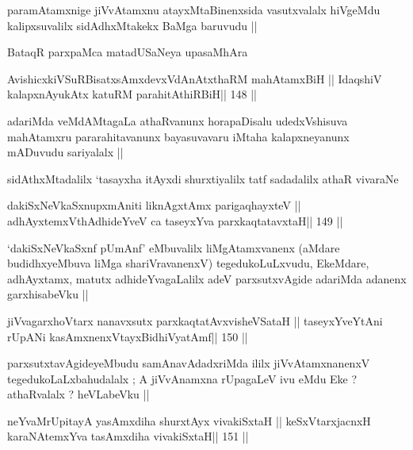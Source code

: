 \begin{artha}
paramAtamxnige jiVvAtamxnu atayxMtaBinenxsida vasutxvalalx hiVgeMdu
kalipxsuvalilx sidAdhxMtakekx BaMga baruvudu ||
\end{artha}

\begin{artha}
BataqR parxpaMca matadUSaNeya upasaMhAra
\end{artha}

\begin{shl}
AvishicxkiVSuRBisatxsAmxdevxVdAnAtxthaRM mahAtamxBiH ||
IdaqshiV kalapxnA\s yukAtx katuRM parahitAthiRBiH\hfill || 148 ||
\end{shl}

\begin{artha}
adariMda veMdAMtagaLa athaRvanunx horapaDisalu udedxVshisuva
mahAtamxru pararahitavanunx bayasuvavaru iMtaha kalapxneyanunx
mADuvudu sariyalalx ||
\end{artha}

\begin{artha}
sidAthxMtadalilx `tasayxha itAyxdi shurxtiyalilx tatf sadadalilx athaR
vivaraNe 
\end{artha}

\begin{shl}
dakiSxNeV\s kaSxnupxmAniti liknAgxtAmx parigaqhayxteV ||
adhAyxtemxV\s thAdhideYveV ca taseyxYva parxkaqtatavxtaH\hfill || 149 ||
\end{shl}

\begin{artha}
`dakiSxNeV\s kaSxnf pUmAnf' eMbuvalilx liMgAtamxvanenx (aMdare
  budidhxyeMbuva liMga shariVravanenxV) tegedukoLuLxvudu, EkeMdare,
  adhAyxtamx, matutx adhideYvagaLalilx adeV parxsutxvAgide adariMda
  adanenx garxhisabeVku ||
\end{artha}

\begin{shl}
jiVvagarxhoV\s tarx nanavxsutx parxkaqtatAvxvisheVSataH ||
taseyxYveYtAni rUpANi kasAmxnenxVtayxBidhiVyatAmf\hfill || 150 ||
\end{shl}

\begin{artha}
parxsutxtavAgideyeMbudu samAnavAdadxriMda ililx jiVvAtamxnanenxV
tegedukoLaLxbahudalalx ; A jiVvAnamxna rUpagaLeV ivu eMdu Eke ?
athaRvalalx ? heVLabeVku ||
\end{artha}

\begin{shl}
neYvaMrUpitayA yasAmxdiha shurxtAyx vivakiSxtaH ||
keSxVtarxjacnxH karaNAtemxYva tasAmxdiha vivakiSxtaH\hfill || 151 ||
\end{shl}

